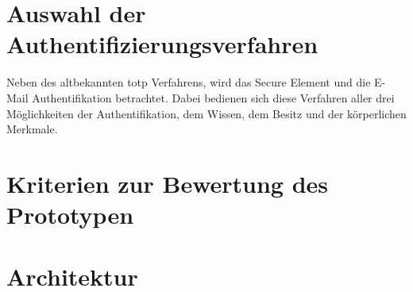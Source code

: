 \section{Auswahl der Authentifizierungsverfahren}
Neben des altbekannten \ac{totp} Verfahrens, wird das Secure Element und die E-Mail Authentifikation betrachtet. Dabei bedienen sich diese Verfahren aller drei Möglichkeiten der Authentifikation, dem Wissen, dem Besitz und der körperlichen Merkmale. 

\section{Kriterien zur Bewertung des Prototypen}
\section{Architektur}
